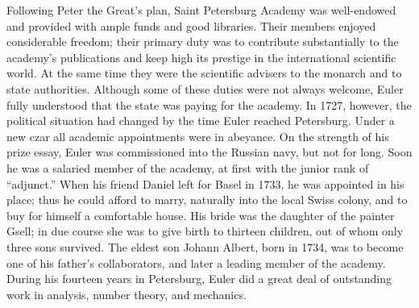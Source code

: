 \documentclass[b5paper]{article}
\begin{document}
\begin{mdframed}
Following Peter the Great's plan, Saint Petersburg Academy was well-endowed and provided with ample funds and good libraries. Their members enjoyed considerable freedom; their primary duty was to contribute substantially to the academy's publications and keep high its prestige in the international scientific world. At the same time they were the scientific advisers to the monarch and to state authorities. Although some of these duties were not always welcome, Euler fully understood that the state was paying for the academy. In 1727, however, the political situation had changed by the time Euler reached Petersburg. Under a new czar all academic appointments were in abeyance. On the strength of his prize essay, Euler was commissioned into the Russian navy, but not for long. Soon he was a salaried member of the academy, at first with the junior rank of \enquote{adjunct.} When his friend Daniel left for Basel in 1733, he was appointed in his place; thus he could afford to marry, naturally into the local Swiss colony, and to buy for himself a comfortable house. His bride was the daughter of the painter Gsell; in due course she was to give birth to thirteen children, out of whom only three sons survived. The eldest son Johann Albert, born in 1734, was to become one of his father's collaborators, and later a leading member of the academy. During his fourteen years in Petersburg, Euler did a great deal of outstanding work in analysis, number theory, and mechanics.


\end{mdframed}
\end{document}
